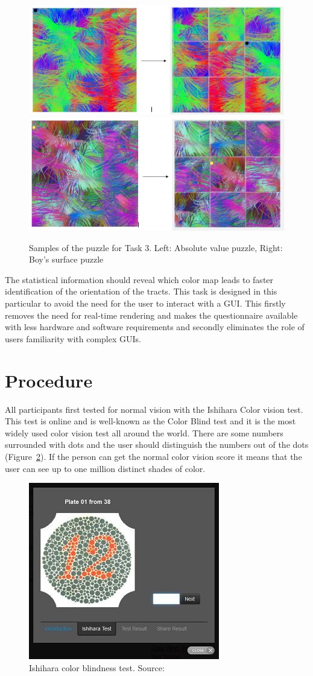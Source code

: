 \documentclass[a4paper, 12pt]{report}
\begin{document}
\begin{itemize}
\begin{figure}[ht]
    \centering
    \includegraphics[width = 0.49 \columnwidth]{absolute-puzzle}
    \includegraphics[width = 0.48 \columnwidth]{boy's-puzzle}
    \caption{ Samples of the puzzle for Task 3. Left:  Absolute value puzzle, Right: Boy's surface puzzle}
    \label{fig:absolute-puzzle}
\end{figure}

The statistical information should reveal which color map leads to faster identification of the orientation of the tracts. This task is designed in this particular to avoid the need for the user to interact with a GUI. This firstly removes the need for real-time rendering and makes the questionnaire available with less hardware and software requirements and secondly eliminates the role of users familiarity with complex GUIs.


\end{itemize}

\section{Procedure}
All participants first tested for normal vision with the Ishihara Color vision test. This test is online and is well-known as the Color Blind test and it is the most widely used color vision test all around the world. There are some numbers surrounded with dots and the user should distinguish the numbers out of the dots (Figure~\ref{fig:Ishihara}). If the person can get the normal color vision score it means that the user can see up to one million distinct shades of color.
\begin{figure}[ht]
    \centering
    \includegraphics[width = 0.6\columnwidth]{Ishihara}
    \caption{Ishihara color blindness test. Source:  \cite{www.color-blindness.com}}
    \label{fig:Ishihara}
\end{figure}
\end{document}
